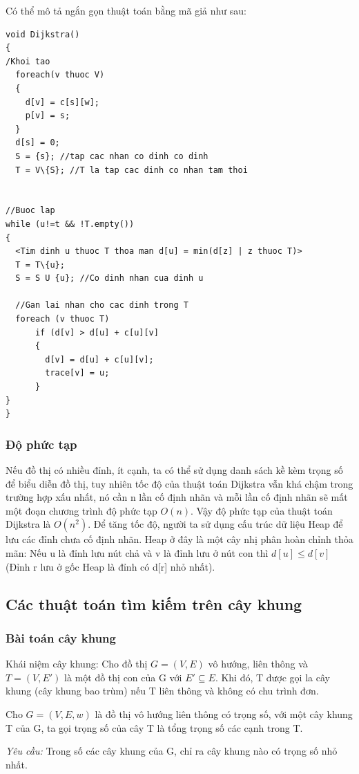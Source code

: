 \documentclass[a4paper,10pt]{article}
\begin{document}
Có thể mô tả ngắn gọn thuật toán bằng mã giả như sau:
\begin{verbatim}
void Dijkstra()
{
/Khoi tao
  foreach(v thuoc V)
  {
    d[v] = c[s][w];
    p[v] = s;
  }
  d[s] = 0;
  S = {s}; //tap cac nhan co dinh co dinh
  T = V\{S}; //T la tap cac dinh co nhan tam thoi


//Buoc lap
while (u!=t && !T.empty())
{
  <Tim dinh u thuoc T thoa man d[u] = min(d[z] | z thuoc T)>
  T = T\{u};
  S = S U {u}; //Co dinh nhan cua dinh u

  //Gan lai nhan cho cac dinh trong T
  foreach (v thuoc T)
      if (d[v] > d[u] + c[u][v]
      {
        d[v] = d[u] + c[u][v];
        trace[v] = u;
      }
}
}
\end{verbatim}

\subsubsection{Độ phức tạp}
Nếu đồ thị có nhiều đỉnh, ít cạnh, ta có thể sử dụng danh sách kề kèm trọng số để biểu diễn đồ thị, tuy nhiên tốc độ của thuật toán Dijkstra vẫn khá chậm trong trường hợp xấu nhất, nó cần n lần cố định nhãn và mỗi lần cố định nhãn sẽ mất một đoạn chương trình độ phức tạp $O(n)$. Vậy độ phức tạp của thuật toán Dijkstra là $O(n^2)$. Để tăng tốc độ, người ta sử dụng cấu trúc dữ liệu Heap để lưu các đỉnh chưa cố định nhãn. Heap ở đây là một cây nhị phân hoàn chỉnh thỏa mãn: Nếu u là đỉnh lưu nút chả và v là đỉnh lưu ở nút con thì $d[u] \leq d[v]$ (Đỉnh r lưu ở gốc Heap là đỉnh có d[r] nhỏ nhất).

\subsection{Các thuật toán tìm kiếm trên cây khung}
\subsubsection{Bài toán cây khung}
Khái niệm cây khung: Cho đồ thị $G = (V, E)$ vô hướng, liên thông và $T = (V, E')$ là một đồ thị con của G với $E' \subseteq E$. Khi đó, T được gọi la cây khung (cây khung bao trùm) nếu T liên thông và không có chu trình đơn.

Cho $G = (V, E, w)$ là đồ thị vô hướng liên thông có trọng số, với một cây khung T của G, ta gọi trọng số của cây T là tổng trọng số các cạnh trong T.

\emph{Yêu cầu:} Trong số các cây khung của G, chỉ ra cây khung nào có trọng số nhỏ nhất.
\end{document}
